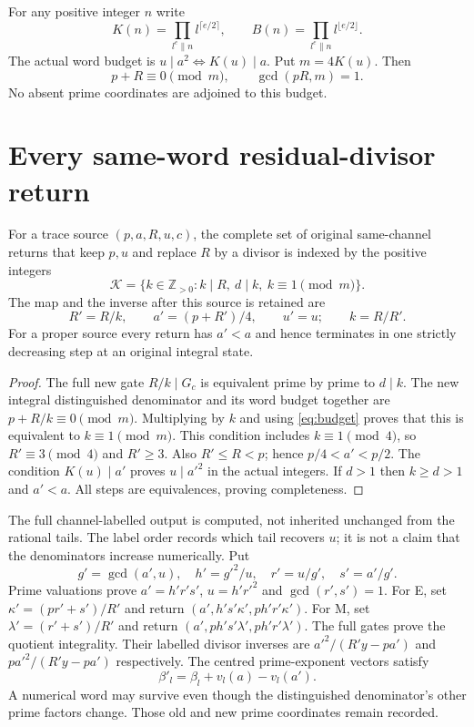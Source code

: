 For any positive integer $n$ write
\[
 K(n)=\prod_{l^e\parallel n}l^{\lceil e/2\rceil},\qquad
 B(n)=\prod_{l^e\parallel n}l^{\lfloor e/2\rfloor}.
\]
The actual word budget is $u\mid a^2\iff K(u)\mid a$.
Put $m=4K(u)$. Then
\begin{equation}\label{eq:budget}
 p+R\equiv0\pmod m,\qquad \gcd(pR,m)=1.
\end{equation}
No absent prime coordinates are adjoined to this budget.

\section{Every same-word residual-divisor return}
\begin{theorem}\label{thm:all}
For a trace source $(p,a,R,u,c)$, the complete set of original same-channel
returns that keep $p,u$ and replace $R$ by a divisor is indexed by the positive
integers
\begin{equation}\label{eq:domain}
 \boxed{\mathcal K=\{k\in\mathbb Z_{>0}:k\mid R,\ d\mid k,\
 k\equiv1\pmod m\}.}
\end{equation}
The map and the inverse after this source is retained are
\begin{equation}\label{eq:map}
 R'=R/k,\qquad a'=(p+R')/4,\qquad u'=u;
 \qquad k=R/R'.
\end{equation}
For a proper source every return has $a'<a$ and hence terminates in one
strictly decreasing step at an original integral state.
\end{theorem}
\begin{proof}
The full new gate $R/k\mid G_c$ is equivalent prime by prime to $d\mid k$.
The new integral distinguished denominator and its word budget together are
$p+R/k\equiv0\pmod m$. Multiplying by $k$ and using \eqref{eq:budget}
proves that this is equivalent to $k\equiv1\pmod m$.
This condition includes $k\equiv1\pmod4$, so $R'\equiv3\pmod4$ and $R'\ge3$.
Also $R'\le R<p$; hence $p/4<a'<p/2$. The condition $K(u)\mid a'$ proves
$u\mid a'^2$ in the actual integers. If $d>1$ then $k\ge d>1$ and $a'<a$.
All steps are equivalences, proving completeness.
\end{proof}

The full channel-labelled output is computed, not inherited unchanged from the
rational tails.  The label order records which tail recovers $u$; it is not a
claim that the denominators increase numerically.  Put
\[
 g'=\gcd(a',u),\quad h'=g'^2/u,\quad r'=u/g',\quad s'=a'/g'.
\]
Prime valuations prove $a'=h'r's'$, $u=h'r'^2$ and $\gcd(r',s')=1$.
For E, set $\kappa'=(pr'+s')/R'$ and return
$(a',h's'\kappa',ph'r'\kappa')$. For M, set
$\lambda'=(r'+s')/R'$ and return $(a',ph's'\lambda',ph'r'\lambda')$.
The full gates prove the quotient integrality. Their labelled divisor inverses
are $a'^2/(R'y-pa')$ and $pa'^2/(R'y-pa')$ respectively.
The centred prime-exponent vectors satisfy
\[
 \beta'_l=\beta_l+v_l(a)-v_l(a').
\]
A numerical word may survive even though the distinguished denominator's other
prime factors change. Those old and new prime coordinates remain recorded.

